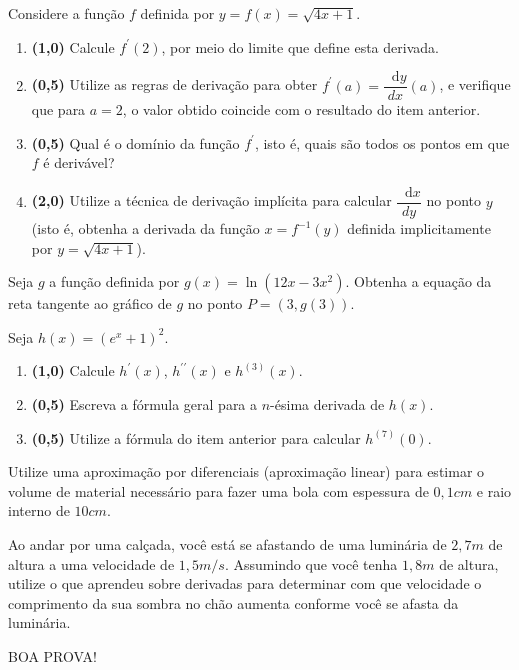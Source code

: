 \documentclass[12pt,a4paper]{article}
\newcommand{\fixme}{{\color{red}(...)}}
\newcommand*\diff{\mathop{}\!\mathrm{d}}
\begin{document}
\begin{ExerciseList}
\Exercise%
Considere a função $f$ definida por $y = f(x) = \sqrt{4x + 1}$.
\begin{enumerate}
\item \textbf{(1,0)} Calcule $f^\prime(2)$, por meio do limite que define esta derivada.
\item \textbf{(0,5)} Utilize as regras de derivação para obter $f^\prime(a) = \dfrac{ \diff{y} } { {dx} } (a)$, e verifique que para $a = 2$, o valor obtido coincide com o resultado do item anterior.
\item \textbf{(0,5)} Qual é o domínio da função $f^\prime$, isto é, quais são todos os pontos em que $f$ é derivável?
\item \textbf{(2,0)} Utilize a técnica de derivação implícita para calcular $\dfrac{ \diff{x} } { {dy} }$ no ponto $y$ (isto é, obtenha a derivada da função $x=f^{-1}(y)$ definida implicitamente por $y = \sqrt{4x + 1}$).
\end{enumerate}

\Answer \fixme

\Exercise[title={2,0}] Seja $g$ a função definida por $g(x) = \ln(12x-3x^2)$. Obtenha a equação da reta tangente ao gráfico de $g$ no ponto $P=(3, g(3))$.
\Answer \fixme

\Exercise%
Seja $h(x)=(e^x + 1)^2$.
\begin{enumerate}
\item \textbf{(1,0)} Calcule $h^\prime(x)$, $h^{\prime\prime}(x)$ e $h^{(3)}(x)$.
\item \textbf{(0,5)} Escreva a fórmula geral para a $n$-ésima derivada de $h(x)$.
\item \textbf{(0,5)} Utilize a fórmula do item anterior para calcular $h^{(7)}(0)$.
\end{enumerate}
\Answer \fixme

\Exercise[title={2,0}] Utilize uma aproximação por diferenciais (aproximação linear) para estimar o volume de material necessário para fazer uma bola com espessura de $0,1 cm$ e raio interno de $10 cm$.

\Exercise[title={2,0}] Ao andar por uma calçada, você está se afastando de uma luminária de $2,7m$ de altura a uma velocidade de $1,5 m/s$. Assumindo que você tenha $1,8m$ de altura, utilize o que aprendeu sobre derivadas para determinar com que velocidade o comprimento da sua sombra no chão aumenta conforme você se afasta da luminária.

\end{ExerciseList}

\begin{center}
BOA PROVA!
\end{center}

\end{document}
